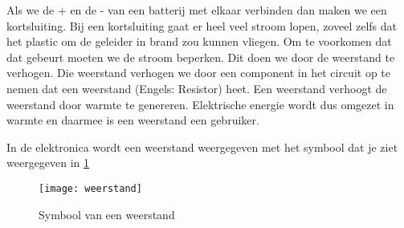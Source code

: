 Als we de + en de - van een batterij met elkaar verbinden dan maken we een kortsluiting. Bij een kortsluiting gaat er heel veel stroom lopen, zoveel zelfs dat het plastic om de geleider in brand zou kunnen vliegen. Om te voorkomen dat dat gebeurt moeten we de stroom beperken. Dit doen we door de weerstand te verhogen. Die weerstand verhogen we door een component in het circuit op te nemen dat een weerstand (Engels: Resistor) heet. Een weerstand verhoogt de weerstand door warmte te genereren. Elektrische energie wordt dus omgezet in warmte en daarmee is een weerstand een gebruiker.

In de elektronica wordt een weerstand weergegeven met het symbool dat je ziet weergegeven in \ref{symbool:weerstand}

\begin{figure}[h]
\texttt{[image: weerstand]}
\centering
\caption{Symbool van een weerstand}
\label{symbool:weerstand}
\end{figure}


